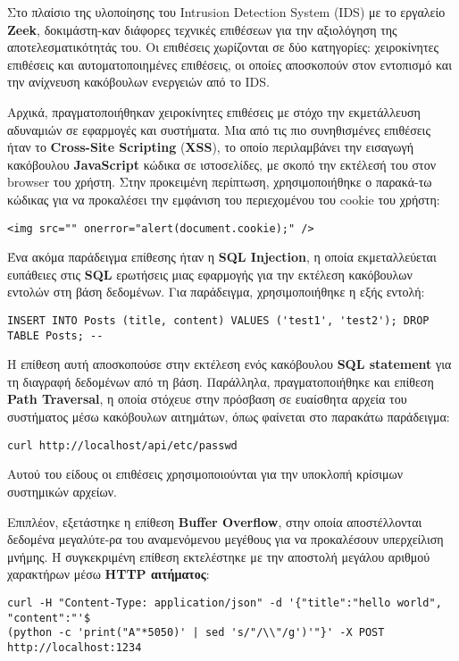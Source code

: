 Στο πλαίσιο της υλοποίησης του Intrusion Detection System (IDS) με το εργαλείο \textbf{Zeek}, δοκιμάστη-καν διάφορες τεχνικές επιθέσεων για την αξιολόγηση της αποτελεσματικότητάς του. Οι επιθέσεις χωρίζονται σε δύο κατηγορίες: χειροκίνητες επιθέσεις και αυτοματοποιημένες επιθέσεις, οι οποίες αποσκοπούν στον εντοπισμό και την ανίχνευση κακόβουλων ενεργειών από το IDS.

Αρχικά, πραγματοποιήθηκαν χειροκίνητες επιθέσεις με στόχο την εκμετάλλευση αδυναμιών σε εφαρμογές και συστήματα. Μια από τις πιο συνηθισμένες επιθέσεις ήταν το \textbf{Cross-Site Scripting} (\textbf{XSS}), το οποίο περιλαμβάνει την εισαγωγή κακόβουλου \textbf{JavaScript} κώδικα σε ιστοσελίδες, με σκοπό την εκτέλεσή του στον browser του χρήστη. Στην προκειμένη περίπτωση, χρησιμοποιήθηκε ο παρακά-τω κώδικας για να προκαλέσει την εμφάνιση του περιεχομένου του cookie του χρήστη:
\begin{lstlisting}
<img src="" onerror="alert(document.cookie);" />
\end{lstlisting}

Ένα ακόμα παράδειγμα επίθεσης ήταν η \textbf{SQL Injection}, η οποία εκμεταλλεύεται ευπάθειες στις \textbf{SQL} ερωτήσεις μιας εφαρμογής για την εκτέλεση κακόβουλων εντολών στη βάση δεδομένων. Για παράδειγμα, χρησιμοποιήθηκε η εξής εντολή:
\begin{lstlisting}
INSERT INTO Posts (title, content) VALUES ('test1', 'test2'); DROP TABLE Posts; --
\end{lstlisting}

Η επίθεση αυτή αποσκοπούσε στην εκτέλεση ενός κακόβουλου \textbf{SQL statement} για τη διαγραφή δεδομένων από τη βάση. Παράλληλα, πραγματοποιήθηκε και επίθεση \textbf{Path Traversal}, η οποία στόχευε στην πρόσβαση σε ευαίσθητα αρχεία του συστήματος μέσω κακόβουλων αιτημάτων, όπως φαίνεται στο παρακάτω παράδειγμα:
\begin{lstlisting}
curl http://localhost/api/etc/passwd
\end{lstlisting}

Αυτού του είδους οι επιθέσεις χρησιμοποιούνται για την υποκλοπή κρίσιμων συστημικών αρχείων.

Επιπλέον, εξετάστηκε η επίθεση \textbf{Buffer Overflow}, στην οποία αποστέλλονται δεδομένα μεγαλύτε-ρα του αναμενόμενου μεγέθους για να προκαλέσουν υπερχείλιση μνήμης. Η συγκεκριμένη επίθεση εκτελέστηκε με την αποστολή μεγάλου αριθμού χαρακτήρων μέσω \textbf{HTTP αιτήματος}:
\begin{lstlisting}
curl -H "Content-Type: application/json" -d '{"title":"hello world", "content":"'$
(python -c 'print("A"*5050)' | sed 's/"/\\"/g')'"}' -X POST http://localhost:1234
\end{lstlisting}

